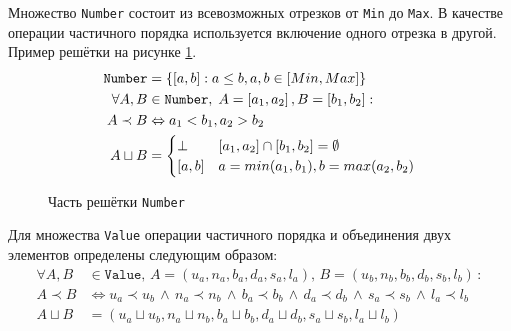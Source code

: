 Множество \texttt{Number} состоит из всевозможных отрезков от
\texttt{Min} до \texttt{Max}. В качестве операции частичного порядка
используется включение одного отрезка в другой. Пример решётки на
рисунке \ref{fig:number}.
\begin{align*}
  \mathtt{Number} &= \left\{ \left[ a,b \right] : a \le b , a,b \in
  \left[ Min, Max \right]  \right\}\\
  \forall  A,B & \in \mathtt{Number}, \thickspace A = \left[  a_1, a_2 \right], B = \left[ b_1, b_2 \right]: \\ 
  A \prec B &\Leftrightarrow a_1 < b_1 , a_2 > b_2 \\
  A \sqcup B &= \begin{cases}
    \bot & \left[ a_1, a_2 \right] \cap \left[ b_1, b_2 \right] = \emptyset \\
    [a, b] & a = min(a_1, b_1), b = max(a_2, b_2)
  \end{cases} 
\end{align*}%
\begin{figure}[htp]
\centering
{}
\caption{Часть решётки \texttt{Number}}
\label{fig:number}
\end{figure}%

Для множества \texttt{Value} операции частичного порядка и объединения
двух элементов определены следующим образом:
\begin{align*}
  \forall A, B &\in \texttt{Value},\, A=\left( u_a, n_a, b_a, d_a,
  s_a, l_a \right),\, B=\left( u_b, n_b, b_b, d_b, s_b, l_b
  \right)\,:\\
  A \prec B &\Leftrightarrow 
    u_a \prec u_b\, \land \,
    n_a \prec n_b\, \land \,
    b_a \prec b_b\, \land \,
    d_a \prec d_b\, \land \,
    s_a \prec s_b\, \land \,
    l_a \prec l_b \\
  A \sqcup B &= \left( 
    u_a \sqcup u_b, 
    n_a \sqcup n_b, 
    b_a \sqcup b_b, 
    d_a \sqcup d_b, 
    s_a \sqcup s_b, 
    l_a \sqcup l_b 
    \right)
\end{align*}%

